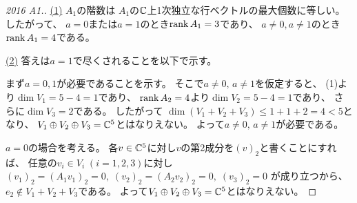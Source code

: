 \documentclass[report]{jlreq}
\begin{document}
%
\begin{proof}[2016 A1.]
    \uline{(1)} \quad
    $A_1$の階数は
    $A_1$の$\mathbb{C}$上1次独立な行ベクトルの最大個数に等しい。
    したがって、
    $a = 0$または$a = 1$のとき$\operatorname{rank} A_1 = 3$であり、
    $a \neq 0, a \neq 1$のとき$\operatorname{rank} A_1 = 4$である。

    \uline{(2)} \quad
    答えは$a = 1$で尽くされることを以下で示す。

    まず$a = 0, 1$が必要であることを示す。
    そこで$a \neq 0, \, a \neq 1$を仮定すると、
    (1)より$\dim V_1 = 5 - 4 = 1$であり、
    $\operatorname{rank} A_2 = 4$より$\dim V_2 = 5 - 4 = 1$であり、
    さらに$\dim V_3 = 2$である。
    したがって
    $\dim (V_1 + V_2 + V_3) \le 1 + 1 + 2 = 4 < 5$となり、
    $V_1 \oplus V_2 \oplus V_3 = \mathbb{C}^5$とはなりえない。
    よって$a \neq 0, \, a \neq 1$が必要である。

    $a = 0$の場合を考える。
    各$v \in \mathbb{C}^5$に対し$v$の第2成分を$(v)_2$と書くことにすれば、
    任意の$v_i \in V_i \; (i = 1, 2, 3)$に対し
    $(v_1)_2 = (A_1 v_1)_2 = 0, \;
        (v_2)_2 = (A_2 v_2)_2 = 0, \;
        (v_3)_2 = 0$
    が成り立つから、
    $e_2 \not\in V_1 + V_2 + V_3$である。
    よって$V_1 \oplus V_2 \oplus V_3 = \mathbb{C}^5$とはなりえない。


\end{proof}
\end{document}
